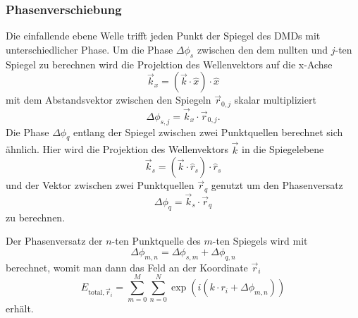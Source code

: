 \subsubsection{Phasenverschiebung}
Die einfallende ebene Welle trifft jeden Punkt der Spiegel des DMDs mit unterschiedlicher Phase. Um die Phase $\Delta\phi_{s}$ zwischen den dem nullten und $j$-ten Spiegel zu berechnen wird die Projektion des Wellenvektors auf die x-Achse
\begin{equation}
    \vec{k}_{x} = \left(\vec{k}\cdot\hat{x}\right)\cdot\hat{x}
\end{equation}
mit dem Abstandsvektor zwischen den Spiegeln $\vec{r}_{0, j}$ skalar multipliziert
\begin{equation}
    \Delta\phi_{s, j} = \vec{k}_x\cdot \vec{r}_{0, j}.
\end{equation}
Die Phase $\Delta\phi_{q}$ entlang der Spiegel zwischen zwei Punktquellen berechnet sich ähnlich. Hier wird die Projektion des Wellenvektors $\vec{k}$ in die Spiegelebene
\begin{equation}
    \vec{k}_{s} = \left(\vec{k}\cdot\hat{r}_{s}\right)\cdot\hat{r}_{s}
\end{equation}
und der Vektor zwischen zwei Punktquellen $\vec{r}_q$ genutzt um den Phasenversatz
\begin{equation}
    \Delta\phi_{q} = \vec{k}_{s}\cdot \vec{r}_q
\end{equation}
zu berechnen.

Der Phasenversatz der $n$-ten Punktquelle des $m$-ten Spiegels wird mit 
\begin{equation}
    \Delta\phi_{m, n} = \Delta\phi_{s, m} + \Delta\phi_{q, n}
\end{equation}
berechnet, womit man dann das Feld an der Koordinate $\vec{r}_i$
\begin{equation}
    E_{\text{total}, \vec{r}_i}=\sum_{m=0}^{M}\sum_{n=0}^{N}\exp(i(k\cdot r_i+\Delta\phi_{m, n}))
\end{equation}
erhält.